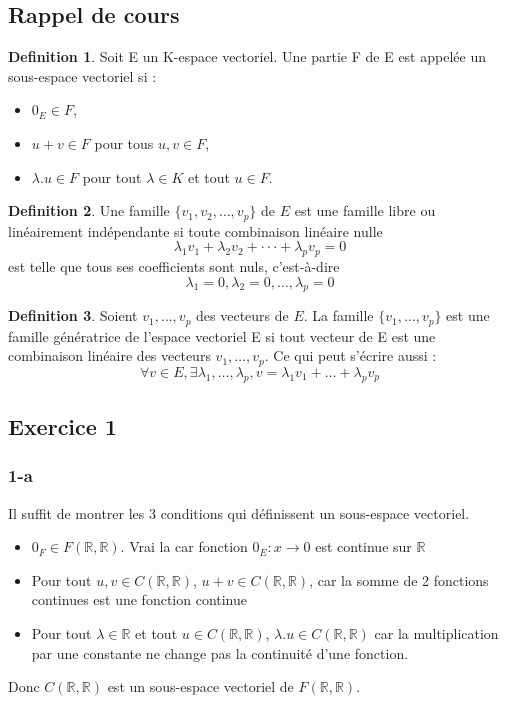 \documentclass[]{book}
\theoremstyle{definition}
\newtheorem{defn}{Definition}
\newcommand{\bb}[1]{\mathbb{#1}}
\newcommand{\R}{\bb{R}}
\begin{document}
\subsection*{Rappel de cours}

\begin{defn}
Soit E un K-espace vectoriel. Une partie F de E est appelée un sous-espace vectoriel si :
\begin{itemize}
\item $0_E \in F$,
\item $u + v \in F$ pour tous $u, v \in F$,
\item $\lambda.u \in F$ pour tout $\lambda \in K$ et tout $u \in F$.
\end{itemize}
\end{defn}


\begin{defn}
Une famille $\{v_1, v_2, \ldots , v_p\}$ de $E$ est une famille libre ou lin\'eairement ind\'ependante si toute combinaison lin\'eaire nulle
$$\lambda_1v_1 + \lambda_2v_2 + ··· + \lambda_p v_p = 0$$
est telle que tous ses coefficients sont nuls, c’est-\`a-dire
$$\lambda_1 = 0, \lambda_2 = 0, \ldots, \lambda_p = 0$$
\end{defn}



\begin{defn}
Soient $v_1, \ldots, v_p$ des vecteurs de $E$. La famille $\{v_1, \ldots, v_p\}$ est une famille g\'en\'eratrice de l'espace vectoriel E si tout vecteur de E est une combinaison lin\'eaire des vecteurs $v_1, \ldots, v_p$. Ce qui peut s'\'ecrire aussi :
$$\forall v \in E, \exists \lambda_1, \ldots, \lambda_p, v = \lambda_1 v_1 + \ldots + \lambda_p v_p$$
\end{defn}


\newpage
\subsection*{Exercice 1}
\subsubsection*{1-a}

Il suffit de montrer les 3 conditions qui d\'efinissent un sous-espace vectoriel.
\begin{itemize}
\item $0_F \in F(\R,\R)$. Vrai la car fonction $0_E:x\to 0$ est continue sur $\R$
\item Pour tout $u, v \in C(\R,\R)$, $u + v \in C(\R,\R)$, car la somme de 2 fonctions continues est une fonction continue 
\item Pour tout $\lambda \in \R$ et tout $u \in C(\R,\R)$, $\lambda.u \in C(\R,\R)$ car la multiplication par une constante ne change pas la continuit\'e d'une fonction.
\end{itemize}
Donc $C(\R,\R)$ est un sous-espace vectoriel de $F(\R,\R)$.
\end{document}
